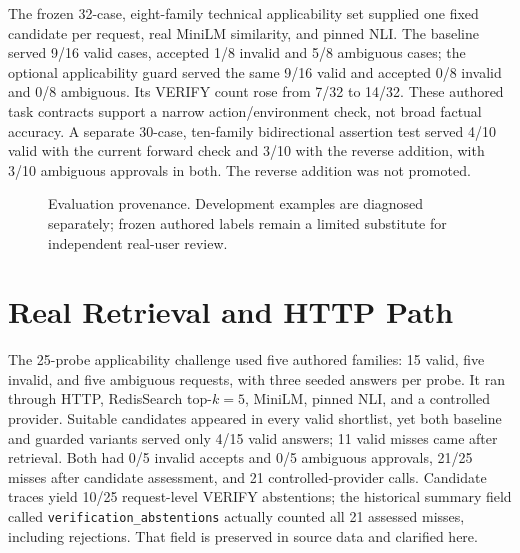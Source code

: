 The frozen 32-case, eight-family technical applicability set supplied one fixed candidate per request, real MiniLM similarity, and pinned NLI. The baseline served 9/16 valid cases, accepted 1/8 invalid and 5/8 ambiguous cases; the optional applicability guard served the same 9/16 valid and accepted 0/8 invalid and 0/8 ambiguous. Its VERIFY count rose from 7/32 to 14/32. These authored task contracts support a narrow action/environment check, not broad factual accuracy. A separate 30-case, ten-family bidirectional assertion test served 4/10 valid with the current forward check and 3/10 with the reverse addition, with 3/10 ambiguous approvals in both. The reverse addition was not promoted.

\begin{figure}[htbp]\centering
{}
\caption{Evaluation provenance. Development examples are diagnosed separately; frozen authored labels remain a limited substitute for independent real-user review.}\label{fig:evalsplit}
\end{figure}

\section{Real Retrieval and HTTP Path}
The 25-probe applicability challenge used five authored families: 15 valid, five invalid, and five ambiguous requests, with three seeded answers per probe. It ran through HTTP, RedisSearch top-$k=5$, MiniLM, pinned NLI, and a controlled provider. Suitable candidates appeared in every valid shortlist, yet both baseline and guarded variants served only 4/15 valid answers; 11 valid misses came after retrieval. Both had 0/5 invalid accepts and 0/5 ambiguous approvals, 21/25 misses after candidate assessment, and 21 controlled-provider calls. Candidate traces yield 10/25 request-level VERIFY abstentions; the historical summary field called \texttt{verification\_abstentions} actually counted all 21 assessed misses, including rejections. That field is preserved in source data and clarified here.

